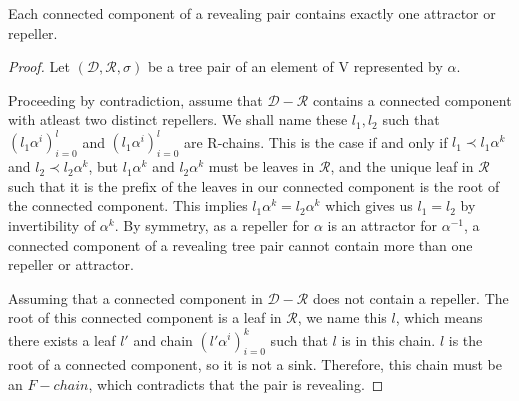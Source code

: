 \documentclass[12pt]{amsart}
\newcommand{\D}{\mathcal{D}}
\newcommand{\R}{\mathcal{R}}
\begin{document}
        \begin{lemma} Each connected component of a revealing pair contains exactly one attractor or repeller.

            \begin{proof}
        
            Let $(\D,\R, \sigma)$ be a tree pair of an element of V represented by $\alpha$.

            Proceeding by contradiction, assume that $\D - \R$ contains a connected component with atleast two distinct repellers. We shall name these $l_1, l_2$ such that $(l_1\alpha^i)_{i=0}^l$ and $(l_1\alpha^i)_{i=0}^l$ are R-chains. This is the case if and only if $l_1 \prec l_1\alpha^k$ and $l_2 \prec l_2\alpha^k$, but $l_1\alpha^k$ and $l_2\alpha^k$ must be leaves in $\R$, and the unique leaf in $\R$ such that it is the prefix of the leaves in our connected component is the root of the connected component. This implies $l_1\alpha^k = l_2\alpha^k$ which gives us $l_1 = l_2$ by invertibility of $\alpha^k$. By symmetry, as a repeller for $\alpha$ is an attractor for $\alpha^{-1}$, a connected component of a revealing tree pair cannot contain more than one repeller or attractor.

            Assuming that a connected component in $\D - \R$ does not contain a repeller. The root of this connected component is a leaf in $\R$, we name this $l$, which means there exists a leaf $l'$ and chain $(l'\alpha^i)_{i=0}^k$ such that $l$ is in this chain. $l$ is the root of a connected component, so it is not a sink. Therefore, this chain must be an $F-chain$, which contradicts that the pair is revealing.


            \end{proof}
        \end{lemma}
        
\end{document}

